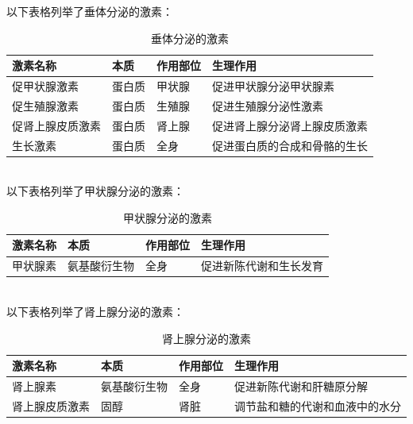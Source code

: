 \documentclass[UTF8]{ctexart}
\begin{document}
    以下表格列举了垂体分泌的激素：\vspace{5pt}
    \begin{table}[h]
        \begin{center}
            \begin{tabular}{l|l|l|l}
                \hline
                激素名称\qquad\qquad&本质\qquad\qquad&作用部位\qquad\qquad&生理作用\qquad\qquad\\ \hline
                促甲状腺激素&蛋白质&甲状腺&促进甲状腺分泌甲状腺素\\ \hline
                促生殖腺激素&蛋白质&生殖腺&促进生殖腺分泌性激素\\ \hline
                促肾上腺皮质激素\qquad\qquad&蛋白质&肾上腺&促进肾上腺分泌肾上腺皮质激素\\ \hline
                生长激素&蛋白质&全身&促进蛋白质的合成和骨骼的生长\\ \hline
            \end{tabular}
            \caption{垂体分泌的激素}
        \end{center}
    \end{table}\\
    以下表格列举了甲状腺分泌的激素：\vspace{5pt}
    \begin{table}[h]
        \begin{center}
            \begin{tabular}{l|l|l|l}
                \hline
                激素名称\qquad\qquad&本质\qquad\qquad&作用部位\qquad\qquad&生理作用\qquad\qquad\\ \hline
                甲状腺素&氨基酸衍生物&全身&促进新陈代谢和生长发育\\ \hline
            \end{tabular}
            \caption{甲状腺分泌的激素}
        \end{center}
    \end{table}\\
    以下表格列举了肾上腺分泌的激素：\vspace{5pt}
    \begin{table}[h!]
        \begin{center}
            \begin{tabular}{l|l|l|l}
                \hline
                激素名称\qquad\qquad&本质\qquad\qquad&作用部位\qquad\qquad&生理作用\qquad\qquad\\ \hline
                肾上腺素&氨基酸衍生物&全身&促进新陈代谢和肝糖原分解\\ \hline
                肾上腺皮质激素&固醇&肾脏&调节盐和糖的代谢和血液中的水分\\ \hline
            \end{tabular}
            \caption{肾上腺分泌的激素}
        \end{center}
    \end{table}\\
\end{document}
